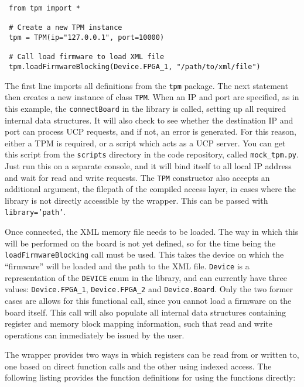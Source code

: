 \documentclass[a4paper,11pt]{article}
\begin{document}
\begin{lstlisting}
 from tpm import *
 
 # Create a new TPM instance
 tpm = TPM(ip="127.0.0.1", port=10000)
 
 # Call load firmware to load XML file
 tpm.loadFirmwareBlocking(Device.FPGA_1, "/path/to/xml/file")
\end{lstlisting}

The first line imports all definitions from the \texttt{tpm} package. The next 
statement then creates a new instance of class \texttt{TPM}. When an IP and 
port are specified, as in this example, the \texttt{connectBoard} in the 
library is called, setting up all required internal 
data structures. It will also check to see whether the destination IP and port 
can process UCP requests, and if not, an error is generated. For this reason, 
either a TPM is required, or a script which acts as a UCP server. You can get 
this script from the \texttt{scripts} directory in the code repository, called 
\texttt{mock\_tpm.py}. Just run this on a separate console, and it will bind 
itself to all local IP address and wait for read and write requests. The 
\texttt{TPM} 
constructor also accepts an additional argument, the filepath of the compiled 
access layer, in cases where the library is not directly accessible by the 
wrapper. This can be passed with \texttt{library='path'}. 

Once connected, the XML memory file needs to be loaded. The way in which this 
will be performed on the board is not yet defined, so for the time being the 
\texttt{loadFirmwareBlocking} call must be used. This takes the device on which 
the ``firmware'' will be loaded and the path to the XML file. \texttt{Device} 
is a representation of the \texttt{DEVICE} enum in the library, and can 
currently have three values: \texttt{Device.FPGA\_1}, \texttt{Device.FPGA\_2} 
and \texttt{Device.Board}. Only the two former cases are allows for this 
functional call, since you cannot load a firmware on the board itself. This 
call will also populate all internal data structures containing register and 
memory block mapping information, such that read and write operations can 
immediately be issued by the user.

The wrapper provides two ways in which registers can be read from or written 
to, one based on direct function calls and the other using indexed access. The 
following listing provides the function definitions for using the functions 
directly:
\end{document}
